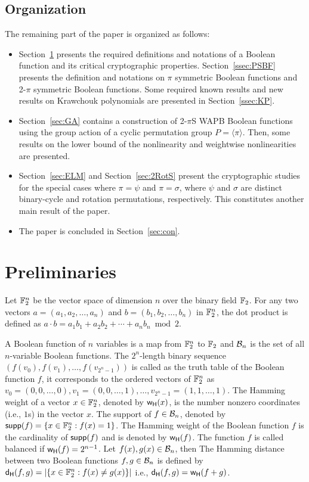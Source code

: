 \documentclass{llncs}
\begin{document}
\subsection{Organization}\label{ssec:org}
The remaining part of the paper is organized as follows:
\begin{itemize}
\item Section~\ref{sec:prel} presents the required definitions and notations of a Boolean function and its critical cryptographic properties.
Section~\ref{ssec:PSBF} presents the definition and notations on $\pi$ symmetric Boolean functions and 2-$\pi$ symmetric Boolean functions.
Some required known results and new results on Krawchouk polynomials are presented in Section~\ref{ssec:KP}.
\item Section~\ref{sec:GA} contains a construction of 2-$\pi$S WAPB Boolean functions using the group action of a cyclic permutation group $P = \langle \pi \rangle$. Then, some results on the lower bound of the nonlinearity and weightwise nonlinearities are presented.
\item 
Section~\ref{sec:ELM} and Section~\ref{sec:2RotS} present the cryptographic studies for the special cases where $\pi = \psi$ and $\pi = \sigma$, where $\psi$ and $ \sigma$ are distinct binary-cycle and rotation permutations, respectively. This constitutes another main result of the paper.
\item The paper is concluded in Section~\ref{sec:con}.
\end{itemize}
\section{Preliminaries}\label{sec:prel}
Let $\mathbb{F}_2^n$ be the vector space of dimension $n$ over the binary field $\mathbb{F}_2$. For any two vectors $a=(a_1, a_2, \ldots, a_n)$ and $b = (b_1, b_2, \ldots, b_n)$ in $\mathbb{F}_2^n$, the dot product is defined as $a\cdot b = a_1 b_1 + a_2 b_2 + \cdots + a_nb_n \bmod 2$.

A Boolean function of $n$ variables is a map from $\mathbb{F}_2^n$ to $\mathbb{F}_2$ and $\mathcal{B}_n$ is the set of all $n$-variable Boolean functions. 
The $2^n$-length binary sequence $(f(v_0), f(v_1), \ldots, f(v_{2^n-1}))$ is called as the truth table of the Boolean function $f$, it corresponds to the ordered vectors of $\mathbb{F}_2^n$ as $v_0 = (0,0,\ldots,0), v_1= (0,0,\ldots,1),\ldots, v_{2^n-1}=(1,1,\ldots,1)$. 
The Hamming weight of a vector $x \in \mathbb{F}_2^n$, denoted by $\mathsf{w_H}(x)$, is the number nonzero coordinates (i.e., $1$s) in the vector $x$. The support of $f \in \mathcal{B}_n$, denoted by $\mathsf{supp}(f)= \{x \in \mathbb{F}_2^n : f(x) = 1\}$. The Hamming weight of the Boolean function $f$ is the cardinality of $\mathsf{supp}(f)$ and is denoted by $\mathsf{w_H}(f)$. The function $f$ is called balanced if $\mathsf{w_H}(f)= 2^{n-1}$. Let $f(x), g(x) \in \mathcal{B}_n$, then 
The Hamming distance between two Boolean functions $f, g \in \mathcal{B}_n$ is defined by $\mathsf{d_H}(f,g) = |\{x \in \mathbb{F}_2^n : f(x) \neq g(x) \}|$  i.e., $\mathsf{d_H}(f,g) = \mathsf{w_H}(f + g)$.
\end{document}
